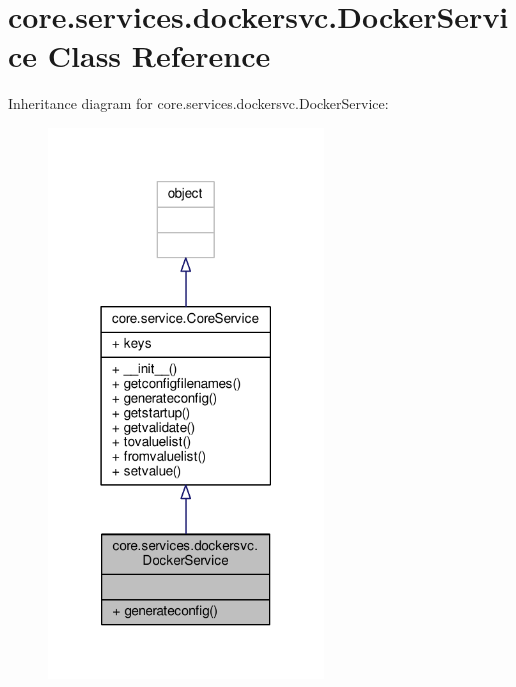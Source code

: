\hypertarget{classcore_1_1services_1_1dockersvc_1_1_docker_service}{\section{core.\+services.\+dockersvc.\+Docker\+Service Class Reference}
\label{classcore_1_1services_1_1dockersvc_1_1_docker_service}
}


Inheritance diagram for core.\+services.\+dockersvc.\+Docker\+Service\+:
\nopagebreak
\begin{figure}[H]
\begin{center}
\leavevmode
\includegraphics[width=207pt]{classcore_1_1services_1_1dockersvc_1_1_docker_service__inherit__graph}
\end{center}
\end{figure}


